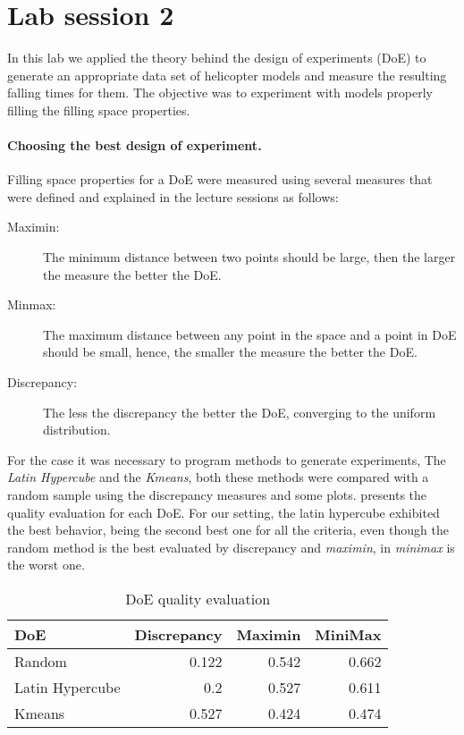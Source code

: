 \section{Lab session 2}

In this lab we applied the theory behind the design of experiments (DoE) to
generate an appropriate data set of helicopter models and measure the resulting
falling times for them. The objective was to experiment with models properly
filling the filling space properties.

\paragraph{Choosing the best design of experiment.} Filling space properties for
a DoE were measured using several measures that were defined and explained in
the lecture sessions as follows:

\begin{description}
	\item[Maximin:] The minimum distance between two points should be large, then
	the larger the measure the better the DoE.

	\item[Minmax:] The maximum distance between any point in the space and a point
	in DoE should be small, hence, the smaller the measure the better the DoE.

	\item[Discrepancy:] The less the discrepancy the better the DoE, converging to
	the uniform distribution.
\end{description}

For the case it was necessary to program methods to generate experiments, The
\emph{Latin Hypercube} and the \emph{Kmeans}, both these methods were compared
with a random sample using the discrepancy measures and some plots.
 presents the quality evaluation for each DoE. For our
setting, the latin hypercube exhibited the best behavior, being the second best
one for all the criteria, even though the random method is the best evaluated by
discrepancy and \emph{maximin}, in \emph{minimax} is the worst one.

\begin{table}[h]
	\centering
	\begin{tabular}{lrrr}
		\toprule
		DoE             & Discrepancy & Maximin & MiniMax \\
		\midrule
		Random          & 0.122       & 0.542   & 0.662 \\
		Latin Hypercube & 0.2         & 0.527   & 0.611 \\
		Kmeans          & 0.527       & 0.424   & 0.474 \\
		\bottomrule
	\end{tabular}
	\caption{DoE quality evaluation} 
	\label{tab:doe_eval} 
\end{table}

